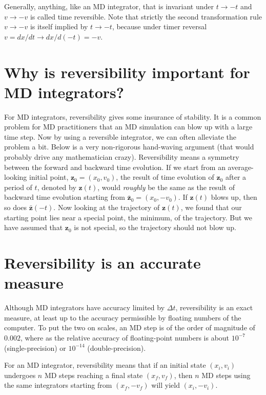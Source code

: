 \documentclass{article}
\begin{document}
Generally, anything, like an MD integrator, that is invariant under
$t \rightarrow -t$ and $v \rightarrow -v$
is called time reversible.
%
Note that strictly the second transformation rule
$v \rightarrow -v$
is itself implied by $t \rightarrow -t$,
because under timer reversal
$v = dx/dt \rightarrow dx/d(-t) = -v$.


\section{Why is reversibility important for MD integrators?}


For MD integrators, reversibility gives some insurance of stability.
%
It is a common problem for MD practitioners that
an MD simulation can blow up with a large time step.
%
Now by using a reversible integrator, we can often alleviate the problem a bit.
%
Below is a very non-rigorous hand-waving argument (that would probably drive
any mathematician crazy).
%
Reversibility means a symmetry between the forward and backward time evolution.
%
If we start from an average-looking initial point, $\mathbf z_0 = (x_0, v_0)$,
the result of time evolution of $\mathbf z_0$ after a period of $t$,
denoted by $\mathbf z(t)$, would \emph{roughly} be the same
as the result of backward time evolution starting from
$\bar {\mathbf z}_0 = (x_0, -v_0)$.
%
If $\mathbf z(t)$ blows up, then so does $\bar{ \mathbf z}(-t)$.
%
Now looking at the trajectory of $\mathbf z(t)$,
we found that our starting point lies near a special point,
the minimum, of the trajectory.
%
But we have assumed that $\mathbf z_0$ is not special,
so the trajectory should not blow up.



\section{Reversibility is an accurate measure}



Although MD integrators have accuracy limited by $\Delta t$,
reversibility is an exact measure,
at least up to the accuracy permissible by floating numbers
of the computer.
%
To put the two on scales, an MD step is of the order of magnitude of $0.002$,
where as the relative accuracy of floating-point numbers
is about $10^{-7}$ (single-precision) or $10^{-14}$ (double-precision).

For an MD integrator,
reversibility means that if an initial state $(x_i, v_i)$
undergoes $n$ MD steps reaching a final state $(x_f, v_f)$,
then $n$ MD steps using the same integrators
starting from $(x_f, -v_f)$ will yield $(x_i, -v_i)$.
\end{document}
